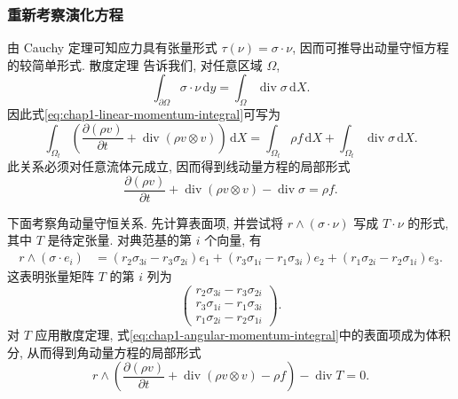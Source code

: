 \subsubsection{重新考察演化方程}
\label{subsec:chap1-evolution-revisited}

由 Cauchy 定理可知应力具有张量形式 $\tau(\nu)=\sigma\cdot\nu$, 因而可推导出动量守恒方程的较简单形式. 散度定理 告诉我们, 对任意区域 $\Omega$,
\[
  \int_{\partial\Omega}\sigma\cdot\nu\,\mathrm{d}y=\int_\Omega\operatorname{div}\sigma\,\mathrm{d}X.
\]
因此式\eqref{eq:chap1-linear-momentum-integral}可写为
\[
\int_{\Omega_t}\left(\frac{\partial(\rho v)}{\partial t}+\operatorname{div}(\rho v\otimes v)\right)\,\mathrm{d}X
=\int_{\Omega_t}\rho f\,\mathrm{d}X+\int_{\Omega_t}\operatorname{div}\sigma\,\mathrm{d}X.
\]
此关系必须对任意流体元成立, 因而得到线动量方程的局部形式
\begin{equation}
\label{eq:chap1-linear-momentum-local}
  \frac{\partial(\rho v)}{\partial t}+\operatorname{div}(\rho v\otimes v)-\operatorname{div}\sigma=\rho f.
\end{equation}

下面考察角动量守恒关系. 先计算表面项, 并尝试将 $r\wedge(\sigma\cdot\nu)$ 写成 $T\cdot\nu$ 的形式, 其中 $T$ 是待定张量. 对典范基的第 $i$ 个向量, 有
\begin{align*}
r\wedge(\sigma\cdot e_i)
&=(r_2\sigma_{3i}-r_3\sigma_{2i})e_1
 +(r_3\sigma_{1i}-r_1\sigma_{3i})e_2
 +(r_1\sigma_{2i}-r_2\sigma_{1i})e_3.
\end{align*}
这表明张量矩阵 $T$ 的第 $i$ 列为
\[
  \begin{pmatrix}r_2\sigma_{3i}-r_3\sigma_{2i}\\r_3\sigma_{1i}-r_1\sigma_{3i}\\r_1\sigma_{2i}-r_2\sigma_{1i}\end{pmatrix}.
\]
对 $T$ 应用散度定理, 式\eqref{eq:chap1-angular-momentum-integral}中的表面项成为体积分, 从而得到角动量方程的局部形式
\begin{equation}
\label{eq:chap1-angular-momentum-local}
  r\wedge\left(\frac{\partial(\rho v)}{\partial t}+\operatorname{div}(\rho v\otimes v)-\rho f\right)-\operatorname{div}T=0.
\end{equation}

